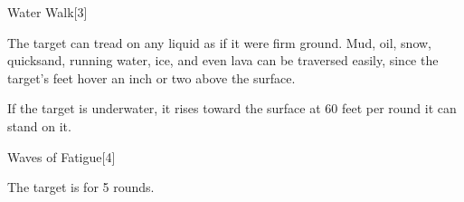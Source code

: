 \begin{spellsection}{Water Walk}[3]
    \begin{spellheader}
    \end{spellheader}
    \begin{spellcontent}
        \begin{spelltargetinginfo}
        \end{spelltargetinginfo}
        \begin{spelleffects}
            \spelleffect The target can tread on any liquid as if it were firm ground. Mud, oil, snow, quicksand, running water, ice, and even lava can be traversed easily, since the target's feet hover an inch or two above the surface.
            \par If the target is underwater, it rises toward the surface at 60 feet per round it can stand on it.
            \spelldur \durlong \dismissable
        \end{spelleffects}
    \end{spellcontent}
    \begin{spellfooter}
        \miscastexplode
    \end{spellfooter}
\end{spellsection}

\begin{spellsection}{Waves of Fatigue}[4]
    \begin{spellheader}
    \end{spellheader}
    \begin{spellcontent}
        \begin{spelltargetinginfo}
        \end{spelltargetinginfo}
        \begin{spelleffects}
            \spelleffect The target is \fatigued for 5 rounds.
        \end{spelleffects}
    \end{spellcontent}
    \begin{spellfooter}
        \miscastexplode
    \end{spellfooter}
\end{spellsection}

